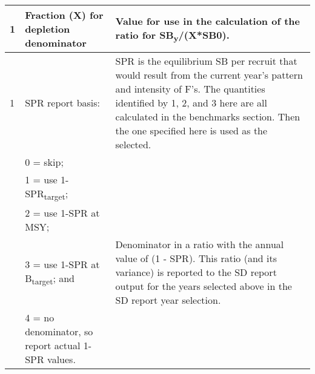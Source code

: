 {\begin{landscape}
\begin{longtable}{p{1.5cm} p{7.2cm} p{12.3cm}}
 \hline
 1 & Fraction (X) for depletion denominator & Value for use in the calculation of the ratio for SB\textsubscript{y}/(X*SB0). \Tstrut\Bstrut\\

 \hline
 1 & SPR report basis: & \multirow{1}{1cm}[-0.25cm]{\parbox{12.5cm}{SPR is the equilibrium SB per recruit that would result from the current year's pattern and intensity of F's. The quantities identified by 1, 2, and 3 here are all calculated in the benchmarks section. Then the one specified here is used as the selected.}} \Tstrut\\
   & 0 = skip; & \\
   & 1 = use 1-SPR\textsubscript{target}; & \\
   & 2 = use 1-SPR at MSY; & \Tstrut\\
   & 3 = use 1-SPR at B\textsubscript{target}; and & \multirow{1}{1cm}[-0.25cm]{\parbox{12.5cm}{Denominator in a ratio with the annual value of (1 - SPR). This ratio (and its variance) is reported to the SD report output for the years selected above in the SD report year selection.}} \Tstrut\\
   & 4 = no denominator, so report actual 1-SPR values. & \\
  

\end{longtable}
\end{landscape}}
